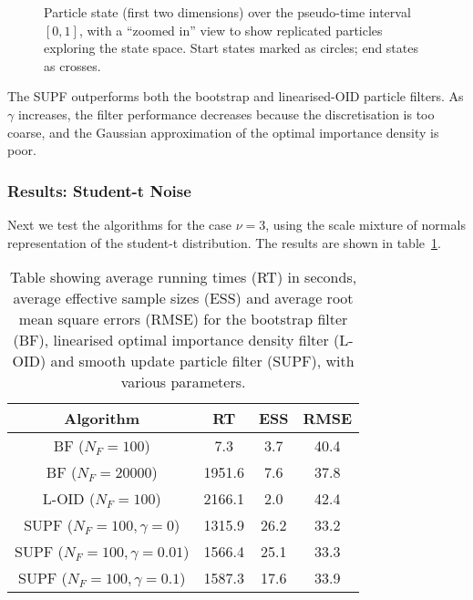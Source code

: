 \documentclass[a4paper,10pt]{article}
\newcommand{\lfdiffsf}{\gamma}                  %
\newcommand{\dof}{\nu}                          %
\begin{document}
\begin{figure}
\centering
{}
\caption{Particle state (first two dimensions) over the pseudo-time interval $[0,1]$, with a ``zoomed in'' view to show replicated particles exploring the state space. Start states marked as circles; end states as crosses.}
\label{fig:nlg_stoch_particle_trajectories}
\end{figure}

The SUPF outperforms both the bootstrap and linearised-OID particle filters. As $\lfdiffsf$ increases, the filter performance decreases because the discretisation is too coarse, and the Gaussian approximation of the optimal importance density is poor.



\subsubsection{Results: Student-t Noise}

Next we test the algorithms for the case $\dof = 3$, using the scale mixture of normals representation of the student-t distribution. The results are shown in table~\ref{tab:nls_results}.

\begin{table}
\centering
\begin{tabular}{c||c|c|c}
Algorithm                        & RT     & ESS  & RMSE \\
\hline
BF ($N_F=100$)                   & 7.3    & 3.7  & 40.4 \\
BF ($N_F=20000$)                 & 1951.6 & 7.6  & 37.8 \\
L-OID ($N_F=100$)                & 2166.1 & 2.0  & 42.4 \\
SUPF ($N_F=100, \lfdiffsf=0$)    & 1315.9 & 26.2 & 33.2 \\
SUPF ($N_F=100, \lfdiffsf=0.01$) & 1566.4 & 25.1 & 33.3 \\
SUPF ($N_F=100, \lfdiffsf=0.1$)  & 1587.3 & 17.6 & 33.9 \\
\end{tabular}
\caption{Table showing average running times (RT) in seconds, average effective sample sizes (ESS) and average root mean square errors (RMSE) for the bootstrap filter (BF), linearised optimal importance density filter (L-OID) and smooth update particle filter (SUPF), with various parameters.}
\label{tab:nls_results}
\end{table}
\end{document}
